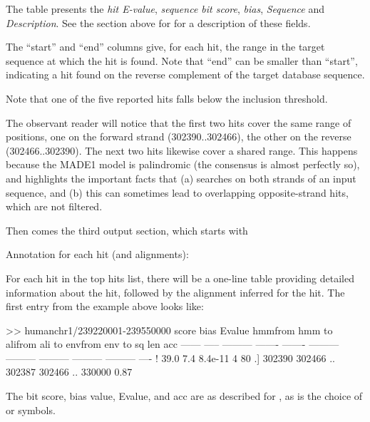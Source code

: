 The table presents the \emph{hit E-value},  \emph{sequence bit score},
\emph{bias}, \emph{Sequence} and \emph{Description}. See the section above for
 for a description of these fields.

The ``start'' and ``end'' columns give, for each hit, the range in the target
sequence at which the hit is found. Note that ``end'' can be smaller than
``start'', indicating a hit found on the reverse complement of the target
database sequence.

Note that one of the five reported hits falls below the inclusion threshold.

The observant reader will notice that the first two hits cover the same range of
positions, one on the forward strand (302390..302466), the other on the reverse
(302466..302390). The next two hits likewise cover a shared range. This
happens because the MADE1 model is palindromic (the consensus is almost
perfectly so), and highlights the important facts that (a) 
searches on both strands of an input sequence, and (b) this can sometimes
lead to overlapping opposite-strand hits, which are not filtered.


Then comes the third output section, which starts with

\begin{sreoutput}
Annotation for each hit  (and alignments):
\end{sreoutput}

For each hit in the top hits list, there will be a one-line table
providing detailed information about the hit, followed by the alignment
inferred for the hit. The first entry from the  example
above looks like: 

\begin{samepage}
\begin{sreoutput}
>> humanchr1/239220001-239550000
    score  bias    Evalue   hmmfrom    hmm to     alifrom    ali to      envfrom    env to    sq len      acc
   ------ ----- ---------   -------   -------    --------- ---------    --------- --------- ---------    ----
 !   39.0   7.4   8.4e-11         4        80 .]    302390    302466 ..    302387    302466 ..    330000    0.87
\end{sreoutput}
\end{samepage}

The bit score, bias value, Evalue, and acc are as described for
, as is the choice of \ccode{!} or  symbols.


